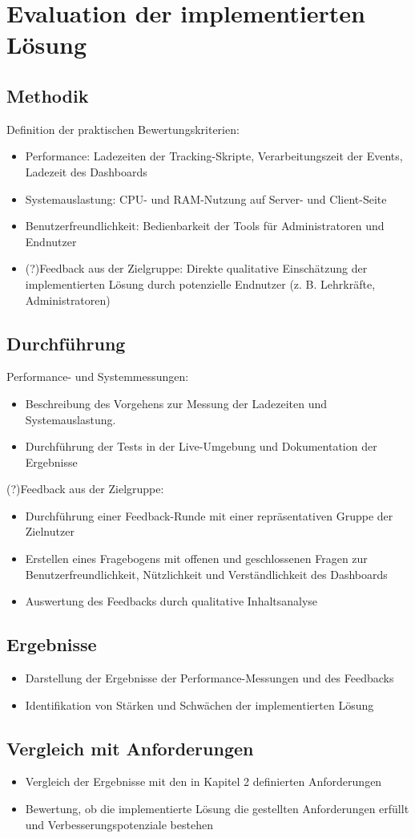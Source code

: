 \chapter{Evaluation der implementierten Lösung}
\label{ch:evaluation}

\section{Methodik}
Definition der praktischen Bewertungskriterien:
\begin{itemize}
    \item Performance: Ladezeiten der Tracking-Skripte, Verarbeitungszeit der Events, Ladezeit des Dashboards
    \item Systemauslastung: CPU- und RAM-Nutzung auf Server- und Client-Seite
    \item Benutzerfreundlichkeit: Bedienbarkeit der Tools für Administratoren und Endnutzer
    \item (?)Feedback aus der Zielgruppe: Direkte qualitative Einschätzung der implementierten Lösung durch potenzielle Endnutzer (z. B. Lehrkräfte, Administratoren)
\end{itemize}

\section{Durchführung}
Performance- und Systemmessungen:
\begin{itemize}
    \item Beschreibung des Vorgehens zur Messung der Ladezeiten und Systemauslastung.
    \item Durchführung der Tests in der Live-Umgebung und Dokumentation der Ergebnisse
\end{itemize}
(?)Feedback aus der Zielgruppe:
\begin{itemize}
    \item Durchführung einer Feedback-Runde mit einer repräsentativen Gruppe der Zielnutzer
    \item Erstellen eines Fragebogens mit offenen und geschlossenen Fragen zur Benutzerfreundlichkeit, Nützlichkeit und Verständlichkeit des Dashboards
    \item Auswertung des Feedbacks durch qualitative Inhaltsanalyse
\end{itemize}

\section{Ergebnisse}
\begin{itemize}
    \item Darstellung der Ergebnisse der Performance-Messungen und des Feedbacks
    \item Identifikation von Stärken und Schwächen der implementierten Lösung
\end{itemize}

\section{Vergleich mit Anforderungen}
\begin{itemize}
    \item Vergleich der Ergebnisse mit den in Kapitel 2 definierten Anforderungen
    \item Bewertung, ob die implementierte Lösung die gestellten Anforderungen erfüllt und Verbesserungspotenziale bestehen
\end{itemize}